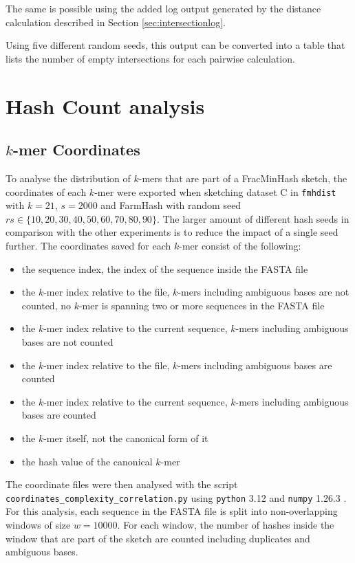 The same is possible using the added log output generated by the distance
calculation described in Section \ref{sec:intersectionlog}.

Using five different random seeds, this output can be converted into a table
that lists the number of empty intersections for each pairwise calculation.


\section{Hash Count analysis}
\subsection*{$k$-mer Coordinates}
To analyse the distribution of $k$-mers that are part of a FracMinHash sketch,
the coordinates of each $k$-mer were exported when sketching dataset C in
\texttt{fmhdist} with $k=21$, $s=2000$ and FarmHash with random seed $rs \in
\{10, 20, 30, 40, 50, 60, 70, 80, 90\}$. The larger amount of different hash
seeds in comparison with the other experiments is to reduce the impact of a
single seed further. The coordinates saved for each $k$-mer consist of the
following:

\begin{itemize}
  \item the sequence index, the index of the sequence inside the FASTA file
  \item the $k$-mer index relative to the file, $k$-mers including
  ambiguous bases are not counted, no $k$-mer is spanning two or more sequences
  in the FASTA file
  \item the $k$-mer index relative to the current sequence, $k$-mers including
  ambiguous bases are not counted
  \item the $k$-mer index relative to the file, $k$-mers including ambiguous
  bases are counted
  \item the $k$-mer index relative to the current sequence, $k$-mers including
  ambiguous bases are counted
  \item the $k$-mer itself, not the canonical form of it
  \item the hash value of the canonical $k$-mer
\end{itemize}

The coordinate files were then analysed with the script
\texttt{coordinates\_complexity\_correlation.py} using \texttt{python} 3.12
\cite{vanrossumPythonReferenceManual2009} and \texttt{numpy} 1.26.3
\cite{ArrayProgrammingNumPy}. For this analysis, each sequence in the FASTA file
is split into non-overlapping windows of size $w=10000$. For each window, the
number of hashes inside the window that are part of the sketch are counted
including duplicates and ambiguous bases.

